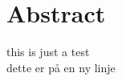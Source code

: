 
\chapter{Abstract}
\label{ch:abstract}

this is just a test \\ dette er på en ny linje


\section{}
